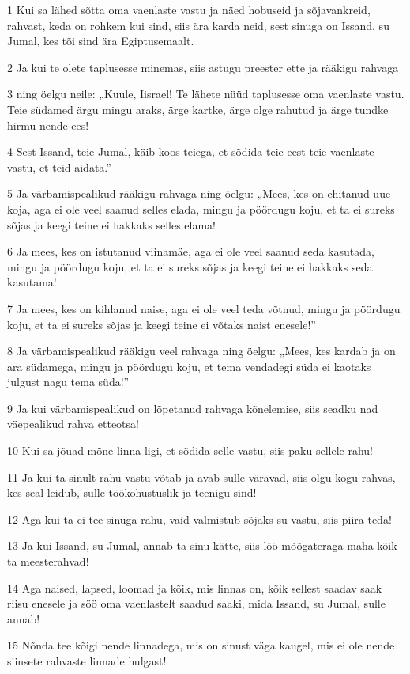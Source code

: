\par 1 Kui sa lähed sõtta oma vaenlaste vastu ja näed hobuseid ja sõjavankreid, rahvast, keda on rohkem kui sind, siis ära karda neid, sest sinuga on Issand, su Jumal, kes tõi sind ära Egiptusemaalt.
\par 2 Ja kui te olete taplusesse minemas, siis astugu preester ette ja rääkigu rahvaga
\par 3 ning öelgu neile: „Kuule, Iisrael! Te lähete nüüd taplusesse oma vaenlaste vastu. Teie südamed ärgu mingu araks, ärge kartke, ärge olge rahutud ja ärge tundke hirmu nende ees!
\par 4 Sest Issand, teie Jumal, käib koos teiega, et sõdida teie eest teie vaenlaste vastu, et teid aidata.”
\par 5 Ja värbamispealikud rääkigu rahvaga ning öelgu: „Mees, kes on ehitanud uue koja, aga ei ole veel saanud selles elada, mingu ja pöördugu koju, et ta ei sureks sõjas ja keegi teine ei hakkaks selles elama!
\par 6 Ja mees, kes on istutanud viinamäe, aga ei ole veel saanud seda kasutada, mingu ja pöördugu koju, et ta ei sureks sõjas ja keegi teine ei hakkaks seda kasutama!
\par 7 Ja mees, kes on kihlanud naise, aga ei ole veel teda võtnud, mingu ja pöördugu koju, et ta ei sureks sõjas ja keegi teine ei võtaks naist enesele!”
\par 8 Ja värbamispealikud rääkigu veel rahvaga ning öelgu: „Mees, kes kardab ja on ara südamega, mingu ja pöördugu koju, et tema vendadegi süda ei kaotaks julgust nagu tema süda!”
\par 9 Ja kui värbamispealikud on lõpetanud rahvaga kõnelemise, siis seadku nad väepealikud rahva etteotsa!
\par 10 Kui sa jõuad mõne linna ligi, et sõdida selle vastu, siis paku sellele rahu!
\par 11 Ja kui ta sinult rahu vastu võtab ja avab sulle väravad, siis olgu kogu rahvas, kes seal leidub, sulle töökohustuslik ja teenigu sind!
\par 12 Aga kui ta ei tee sinuga rahu, vaid valmistub sõjaks su vastu, siis piira teda!
\par 13 Ja kui Issand, su Jumal, annab ta sinu kätte, siis löö mõõgateraga maha kõik ta meesterahvad!
\par 14 Aga naised, lapsed, loomad ja kõik, mis linnas on, kõik sellest saadav saak riisu enesele ja söö oma vaenlastelt saadud saaki, mida Issand, su Jumal, sulle annab!
\par 15 Nõnda tee kõigi nende linnadega, mis on sinust väga kaugel, mis ei ole nende siinsete rahvaste linnade hulgast!

